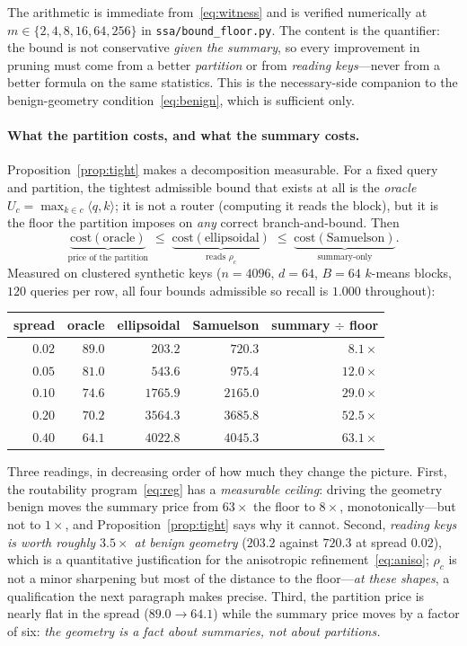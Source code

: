 \documentclass[11pt]{article}
\numberwithin{equation}{section}
\newcommand{\inner}[2]{\langle #1, #2\rangle}
\begin{document}
\noindent The arithmetic is immediate from~\eqref{eq:witness} and is verified numerically at
$m\in\{2,4,8,16,64,256\}$ in \texttt{ssa/bound\_floor.py}. The content is the quantifier: the bound is not
conservative \emph{given the summary}, so every improvement in pruning must come from a better \emph{partition}
or from \emph{reading keys}---never from a better formula on the same statistics. This is the necessary-side
companion to the benign-geometry condition~\eqref{eq:benign}, which is sufficient only.

\paragraph{What the partition costs, and what the summary costs.} Proposition~\ref{prop:tight} makes a
decomposition measurable. For a fixed query and partition, the tightest admissible bound that exists at all is
the \emph{oracle} $U_c=\max_{k\in c}\inner{q}{k}$; it is not a router (computing it reads the block), but it
is the floor the partition imposes on \emph{any} correct branch-and-bound. Then
\[
\underbrace{\text{cost}(\text{oracle})}_{\text{price of the partition}}
\;\le\;
\underbrace{\text{cost}(\text{ellipsoidal})}_{\text{reads }\rho_c}
\;\le\;
\underbrace{\text{cost}(\text{Samuelson})}_{\text{summary-only}} .
\]
Measured on clustered synthetic keys ($n=4096$, $d=64$, $B=64$ $k$-means blocks, $120$ queries per row, all
four bounds admissible so recall is $1.000$ throughout):

\begin{center}
\begin{tabular}{rrrrr}
\toprule
spread & oracle & ellipsoidal & Samuelson & summary $\div$ floor\\
\midrule
$0.02$ & $89.0$ & $203.2$ & $720.3$ & $8.1\times$\\
$0.05$ & $81.0$ & $543.6$ & $975.4$ & $12.0\times$\\
$0.10$ & $74.6$ & $1765.9$ & $2165.0$ & $29.0\times$\\
$0.20$ & $70.2$ & $3564.3$ & $3685.8$ & $52.5\times$\\
$0.40$ & $64.1$ & $4022.8$ & $4045.3$ & $63.1\times$\\
\bottomrule
\end{tabular}
\end{center}

Three readings, in decreasing order of how much they change the picture. First, the routability
program~\eqref{eq:reg} has a \emph{measurable ceiling}: driving the geometry benign moves the summary price
from $63\times$ the floor to $8\times$, monotonically---but not to $1\times$, and
Proposition~\ref{prop:tight} says why it cannot. Second, \emph{reading keys is worth roughly $3.5\times$ at
benign geometry} ($203.2$ against $720.3$ at spread $0.02$), which is a quantitative justification for the
anisotropic refinement~\eqref{eq:aniso}; $\rho_c$ is not a minor sharpening but most of the distance to the
floor---\emph{at these shapes}, a qualification the next paragraph makes precise. Third, the partition price is nearly flat in the spread ($89.0\to 64.1$) while the summary price moves
by a factor of six: \emph{the geometry is a fact about summaries, not about partitions.}
\end{document}
